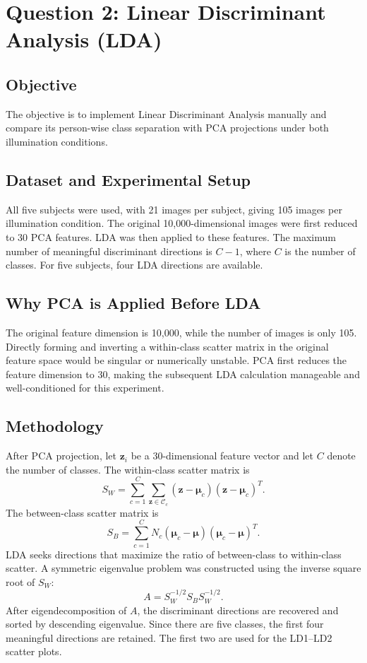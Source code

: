 \documentclass[12pt,a4paper]{report}
\begin{document}
\chapter{Question 2: Linear Discriminant Analysis (LDA)}

\section{Objective}
The objective is to implement Linear Discriminant Analysis manually and compare its person-wise class separation with PCA projections under both illumination conditions.

\section{Dataset and Experimental Setup}
All five subjects were used, with 21 images per subject, giving 105 images per illumination condition. The original 10,000-dimensional images were first reduced to 30 PCA features. LDA was then applied to these features. The maximum number of meaningful discriminant directions is $C-1$, where $C$ is the number of classes. For five subjects, four LDA directions are available.

\section{Why PCA is Applied Before LDA}
The original feature dimension is 10,000, while the number of images is only 105. Directly forming and inverting a within-class scatter matrix in the original feature space would be singular or numerically unstable. PCA first reduces the feature dimension to 30, making the subsequent LDA calculation manageable and well-conditioned for this experiment.

\section{Methodology}
After PCA projection, let $\mathbf{z}_i$ be a 30-dimensional feature vector and let $C$ denote the number of classes. The within-class scatter matrix is
\[
S_W=\sum_{c=1}^{C}\sum_{\mathbf{z}\in\mathcal{C}_c}
(\mathbf{z}-\boldsymbol{\mu}_c)(\mathbf{z}-\boldsymbol{\mu}_c)^T.
\]
The between-class scatter matrix is
\[
S_B=\sum_{c=1}^{C}N_c
(\boldsymbol{\mu}_c-\boldsymbol{\mu})
(\boldsymbol{\mu}_c-\boldsymbol{\mu})^T.
\]
LDA seeks directions that maximize the ratio of between-class to within-class scatter. A symmetric eigenvalue problem was constructed using the inverse square root of $S_W$:
\[
A=S_W^{-1/2}S_BS_W^{-1/2}.
\]
After eigendecomposition of $A$, the discriminant directions are recovered and sorted by descending eigenvalue. Since there are five classes, the first four meaningful directions are retained. The first two are used for the LD1--LD2 scatter plots.
\end{document}
